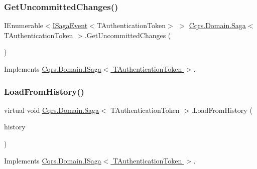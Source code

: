 \mbox{\label{classCqrs_1_1Domain_1_1Saga_a043e8e21e7550c34f5848af7a87e33cd}} 
\subsubsection{\texorpdfstring{Get\+Uncommitted\+Changes()}{GetUncommittedChanges()}}
{\footnotesize\ttfamily I\+Enumerable$<$\hyperlink{interfaceCqrs_1_1Events_1_1ISagaEvent}{I\+Saga\+Event}$<$T\+Authentication\+Token$>$ $>$ \hyperlink{classCqrs_1_1Domain_1_1Saga}{Cqrs.\+Domain.\+Saga}$<$ T\+Authentication\+Token $>$.Get\+Uncommitted\+Changes (\begin{DoxyParamCaption}{ }\end{DoxyParamCaption})}



Implements \hyperlink{interfaceCqrs_1_1Domain_1_1ISaga_abb77811b4f7d19adb61f9d33da18e7e0}{Cqrs.\+Domain.\+I\+Saga$<$ T\+Authentication\+Token $>$}.

\mbox{\label{classCqrs_1_1Domain_1_1Saga_a6029fc09445e2093f7fb40e304a04ff8}} 
\subsubsection{\texorpdfstring{Load\+From\+History()}{LoadFromHistory()}}
{\footnotesize\ttfamily virtual void \hyperlink{classCqrs_1_1Domain_1_1Saga}{Cqrs.\+Domain.\+Saga}$<$ T\+Authentication\+Token $>$.Load\+From\+History (\begin{DoxyParamCaption}\item[{I\+Enumerable$<$ \hyperlink{interfaceCqrs_1_1Events_1_1ISagaEvent}{I\+Saga\+Event}$<$ T\+Authentication\+Token $>$$>$}]{history }\end{DoxyParamCaption})\hspace{0.3cm}{\ttfamily [virtual]}}



Implements \hyperlink{interfaceCqrs_1_1Domain_1_1ISaga_a2714804684bc65cf4dec79b4697b9b21}{Cqrs.\+Domain.\+I\+Saga$<$ T\+Authentication\+Token $>$}.


